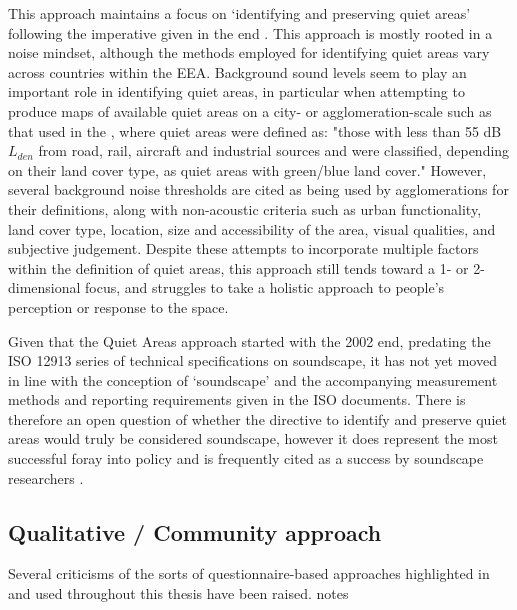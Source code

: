 This approach maintains a focus on `identifying and preserving quiet areas' \citep{EEA2020Environment} following the imperative given in the \gls{end} \citep{EU2002Directive}. This approach is mostly rooted in a noise mindset, although the methods employed for identifying quiet areas vary across countries within the EEA. Background sound levels seem to play an important role in identifying quiet areas, in particular when attempting to produce maps of available quiet areas on a city- or agglomeration-scale such as that used in the \citet{EEA2020Environment}, where quiet areas were defined as: "those with less than 55 dB $L_{den}$ from road, rail, aircraft and industrial sources and were classified, depending on their land cover type, as quiet areas with green/blue land cover." However, several background noise thresholds are cited as being used by agglomerations for their definitions, along with non-acoustic criteria such as urban functionality, land cover type, location, size and accessibility of the area, visual qualities, and subjective judgement. %
Despite these attempts to incorporate multiple factors within the definition of quiet areas, this approach still tends toward a 1- or 2-dimensional focus, and struggles to take a holistic approach to people's perception or response to the space.

Given that the Quiet Areas approach started with the 2002 \gls{end}, predating the ISO 12913 series of technical specifications on soundscape, it has not yet moved in line with the conception of `soundscape' and the accompanying measurement methods and reporting requirements given in the ISO documents. There is therefore an open question of whether the directive to identify and preserve quiet areas would truly be considered soundscape, however it does represent the most successful foray into policy and is frequently cited as a success by soundscape researchers .

\subsection{Qualitative / Community approach}

Several criticisms of the sorts of questionnaire-based approaches highlighted in \citet{ISO12913Part2} and used throughout this thesis have been raised. \citet{Bild2018Public} notes

